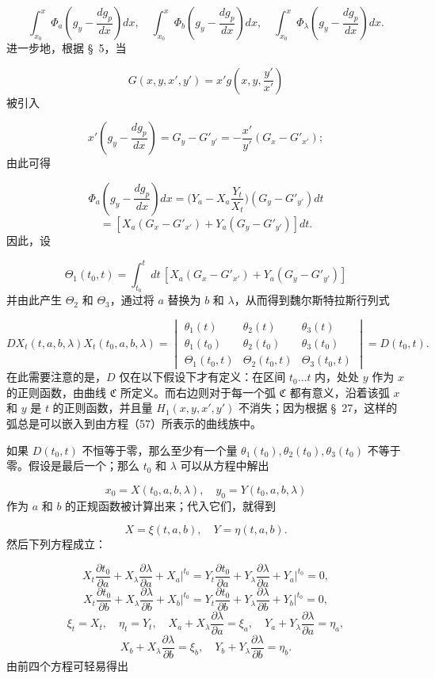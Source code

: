 \documentclass[11pt,a4paper,leqno]{article}
\begin{document}
\[
\int_{x_0}^{x}\Phi_a\left(g_y-\frac{dg_p}{dx}\right)dx,
\quad
\int_{x_0}^{x}\Phi_b\left(g_y-\frac{dg_p}{dx}\right)dx,
\quad
\int_{x_0}^{x}\Phi_\lambda\left(g_y-\frac{dg_p}{dx}\right)dx.
\]
进一步地，根据 \S~5，当

\[
G(x,y,x',y')=x'g\left(x,y,\frac{y'}{x'}\right)
\]
被引入

\[
x'\left(g_y-\frac{dg_p}{dx}\right)=G_y-G'_{y'}=-\frac{x'}{y'}(G_x-G'_{x'});
\]
由此可得

\[
\Phi_a\left(g_y-\frac{dg_p}{dx}\right)dx=\biggl(Y_a-X_a\frac{Y_t}{X_t}\biggr)(G_y-G'_{y'})dt
\]
\[
=[X_a(G_x-G'_{x'})+Y_a(G_y-G'_{y'})]dt.
\]
因此，设

\[
\Theta_1(t_0,t)=\int_{t_0}^{t}dt\,[X_a(G_x-G'_{x'})+Y_a(G_y-G'_{y'})]
\]
并由此产生 $\Theta_2$ 和 $\Theta_3$，通过将 $a$ 替换为 $b$ 和 $\lambda$，从而得到魏尔斯特拉斯行列式

\[
D X_t(t,a,b,\lambda)X_t(t_0,a,b,\lambda)=
\begin{vmatrix}
\theta_1(t)&\theta_2(t)&\theta_3(t)\\
\theta_1(t_0)&\theta_2(t_0)&\theta_3(t_0)\\
\Theta_1(t_0,t)&\Theta_2(t_0,t)&\Theta_3(t_0,t)
\end{vmatrix}=D(t_0,t).
\]
在此需要注意的是，$D$ 仅在以下假设下才有定义：在区间 $t_0\ldots t$ 内，处处 $y$ 作为 $x$ 的正则函数，由曲线 $\mathfrak{C}$ 所定义。而右边则对于每一个弧 $\mathfrak{C}$ 都有意义，沿着该弧 $x$ 和 $y$ 是 $t$ 的正则函数，并且量 $H_1(x,y,x',y')$ 不消失；因为根据 \S~27，这样的弧总是可以嵌入到由方程（57）所表示的曲线族中。

如果 $D(t_0,t)$ 不恒等于零，那么至少有一个量 $\theta_1(t_0),\theta_2(t_0),\theta_3(t_0)$ 不等于零。假设是最后一个；那么 $t_0$ 和 $\lambda$ 可以从方程中解出

\[
x_0=X(t_0,a,b,\lambda),
\quad y_0=Y(t_0,a,b,\lambda)
\]
作为 $a$ 和 $b$ 的正规函数被计算出来；代入它们，就得到

\[
X=\xi(t,a,b),
\quad Y=\eta(t,a,b).
\]
然后下列方程成立：

\[
X_t\frac{\partial t_0}{\partial a}+X_\lambda\frac{\partial\lambda}{\partial a}+X_a\bigg|^{t_0}=Y_t\frac{\partial t_0}{\partial a}+Y_\lambda\frac{\partial\lambda}{\partial a}+Y_a\bigg|^{t_0}=0,
\]
\[
X_t\frac{\partial t_0}{\partial b}+X_\lambda\frac{\partial\lambda}{\partial b}+X_b\bigg|^{t_0}=Y_t\frac{\partial t_0}{\partial b}+Y_\lambda\frac{\partial\lambda}{\partial b}+Y_b\bigg|^{t_0}=0,
\]
\[
\xi_t=X_t,
\quad \eta_t=Y_t,
\quad X_a+X_\lambda\frac{\partial\lambda}{\partial a}=\xi_a,
\quad Y_a+Y_\lambda\frac{\partial\lambda}{\partial a}=\eta_a,
\]
\[
X_b+X_\lambda\frac{\partial\lambda}{\partial b}=\xi_b,
\quad Y_b+Y_\lambda\frac{\partial\lambda}{\partial b}=\eta_b.
\]
由前四个方程可轻易得出
\end{document}
